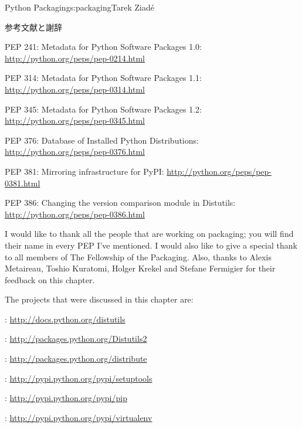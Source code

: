 \begin{aosachapter}{Python Packaging}{s:packaging}{Tarek Ziad\'{e}}
\begin{aosasect1}{参考文献と謝辞}
\begin{aosaitemize}
  \item PEP 241: Metadata for Python Software Packages 1.0: \url{http://python.org/peps/pep-0214.html}
  \item PEP 314: Metadata for Python Software Packages 1.1: \url{http://python.org/peps/pep-0314.html}
  \item PEP 345: Metadata for Python Software Packages 1.2: \url{http://python.org/peps/pep-0345.html}
  \item PEP 376: Database of Installed Python Distributions: \url{http://python.org/peps/pep-0376.html}
  \item PEP 381: Mirroring infrastructure for PyPI: \url{http://python.org/peps/pep-0381.html}
  \item PEP 386: Changing the version comparison module in Distutils: \url{http://python.org/peps/pep-0386.html}
\end{aosaitemize}

I would like to thank all the people that are working on packaging;
you will find their name in every PEP I've mentioned. I would also
like to give a special thank to all members of The Fellowship of the
Packaging.  Also, thanks to Alexis Metaireau, Toshio Kuratomi, Holger
Krekel and Stefane Fermigier for their feedback on this chapter.

The projects that were discussed in this chapter are:

\begin{aosaitemize}
  \item {}: \url{http://docs.python.org/distutils}
  \item {}: \url{http://packages.python.org/Distutils2}
  \item {}: \url{http://packages.python.org/distribute}
  \item {}: \url{http://pypi.python.org/pypi/setuptools}
  \item {}: \url{http://pypi.python.org/pypi/pip}
  \item {}: \url{http://pypi.python.org/pypi/virtualenv}
\end{aosaitemize}

\end{aosasect1}

\end{aosachapter}
